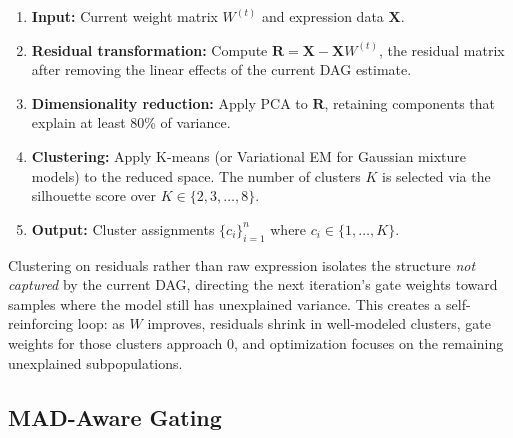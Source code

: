 \documentclass[12pt,a4paper]{article}
\begin{document}
\begin{enumerate}[leftmargin=*,itemsep=2pt]




    \item \textbf{Input:} Current weight matrix $W^{(t)}$ and expression data $\mathbf{X}$.




    \item \textbf{Residual transformation:} Compute $\mathbf{R} = \mathbf{X} - \mathbf{X}W^{(t)}$, the residual matrix after removing the linear effects of the current DAG estimate.




    \item \textbf{Dimensionality reduction:} Apply PCA to $\mathbf{R}$, retaining components that explain at least 80\% of variance.




    \item \textbf{Clustering:} Apply K-means (or Variational EM for Gaussian mixture models) to the reduced space. The number of clusters $K$ is selected via the silhouette score over $K \in \{2, 3, \ldots, 8\}$.




    \item \textbf{Output:} Cluster assignments $\{c_i\}_{i=1}^n$ where $c_i \in \{1,\ldots,K\}$.




\end{enumerate}









Clustering on residuals rather than raw expression isolates the structure \textit{not captured} by the current DAG, directing the next iteration's gate weights toward samples where the model still has unexplained variance. This creates a self-reinforcing loop: as $W$ improves, residuals shrink in well-modeled clusters, gate weights for those clusters approach 0, and optimization focuses on the remaining unexplained subpopulations.









\subsection{MAD-Aware Gating}
\end{document}
